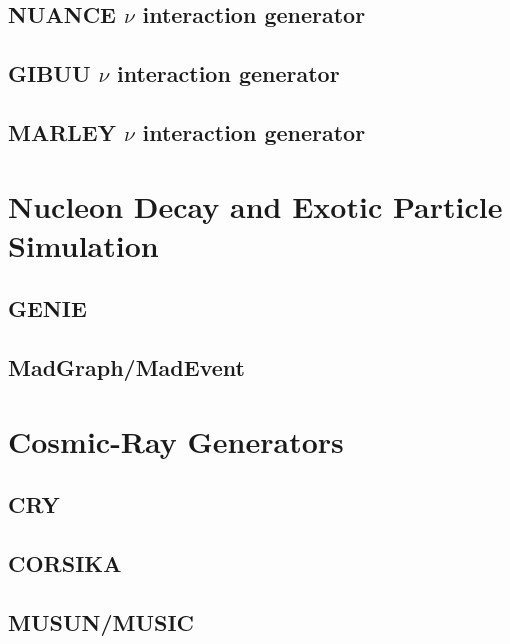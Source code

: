 \subsection{NUANCE $\nu$ interaction generator}

\subsection{GIBUU $\nu$ interaction generator}

\subsection{MARLEY $\nu$ interaction generator}

\section{Nucleon Decay and Exotic Particle Simulation}

\subsection{GENIE}

\subsection{MadGraph/MadEvent}

\section{Cosmic-Ray Generators}

\subsection{CRY}

\subsection{CORSIKA}

\subsection{MUSUN/MUSIC}

